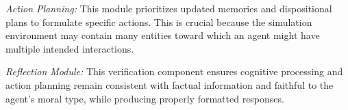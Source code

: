 \textit{Action Planning:} This module prioritizes updated memories and dispositional plans to formulate specific actions. This is crucial because the simulation environment may contain many entities toward which an agent might have multiple intended interactions.

\textit{Reflection Module:} This verification component ensures cognitive processing and action planning remain consistent with factual information and faithful to the agent's moral type, while producing properly formatted responses.
